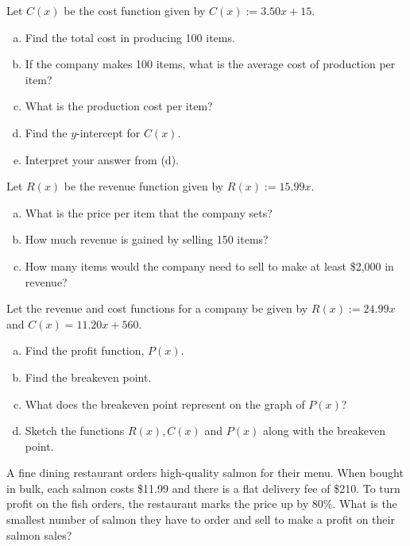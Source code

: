 \documentclass[11pt,letterpaper]{article}
\begin{document}

 Let $C(x)$ be the cost function given by $C(x):= 3.50x + 15$.
        \begin{enumerate}[(a)]
        \item Find the total cost in producing 100 items. \vfill
        \item If the company makes 100 items, what is the average cost of production per item? \vfill
        \item What is the production cost per item? \vfill
        \item Find the $y$-intercept for $C(x)$. \vfill
        \item Interpret your answer from (d). \vfill
        \end{enumerate}



\newpage



 Let $R(x)$ be the revenue function given by $R(x):= 15.99x$. 
	\begin{enumerate}[(a)]
	\item What is the price per item that the company sets? \vfill
	\item How much revenue is gained by selling 150 items? \vfill
	\item How many items would the company need to sell to make at least \$2,000 in revenue? \vfill 
	\end{enumerate}



\newpage



 Let the revenue and cost functions for a company be given by $R(x):= 24.99x$ and $C(x)= 11.20x + 560$. 
\begin{enumerate}[(a)]
\item Find the profit function, $P(x)$. \vfill
\item Find the breakeven point. \vfill
\item What does the breakeven point represent on the graph of $P(x)$? \vfill
\item Sketch the functions $R(x), C(x)$ and $P(x)$ along with the breakeven point. \vfill
\end{enumerate}



\newpage



 A fine dining restaurant orders high-quality salmon for their menu. When bought in bulk, each salmon costs \$11.99 and there is a flat delivery fee of \$210. To turn profit on the fish orders, the restaurant marks the price up by 80\%. What is the smallest number of salmon they have to order and sell to make a profit on their salmon sales? 
\end{document}
